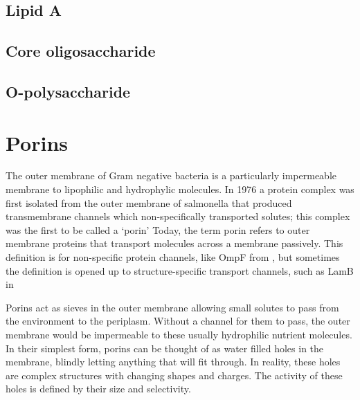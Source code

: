   \subsection{Lipid A}\label{sec:lipidA-intro}

  \subsection{Core oligosaccharide} \label{sec:core-oligosaccharide-intro}

  \subsection{O-polysaccharide}\label{sec:o-polysaccharide}

  \section{Porins} \label{sec:intro-porins}   
 
The outer membrane of Gram negative bacteria is a particularly impermeable membrane to lipophilic and hydrophylic molecules. In 1976 a protein complex was first isolated from the outer membrane of \ac{salmonella} that produced transmembrane channels which non-specifically transported solutes; this complex was the first to be called a `porin' Today, the term porin refers to outer membrane proteins that transport molecules across a membrane passively. This definition is for non-specific protein channels, like OmpF from \ecoli{}, but sometimes the definition is opened up to structure-specific transport channels, such as LamB in \ecoli{} 

Porins act as sieves in the outer membrane allowing small solutes to pass from the environment to the periplasm. Without a channel for them to pass, the outer membrane would be impermeable to these usually hydrophilic nutrient molecules. In their simplest form, porins can be thought of as water filled holes in the membrane, blindly letting anything that will fit through. In reality, these holes are complex structures with changing shapes and charges. The activity of these holes is defined by their size and selectivity.

